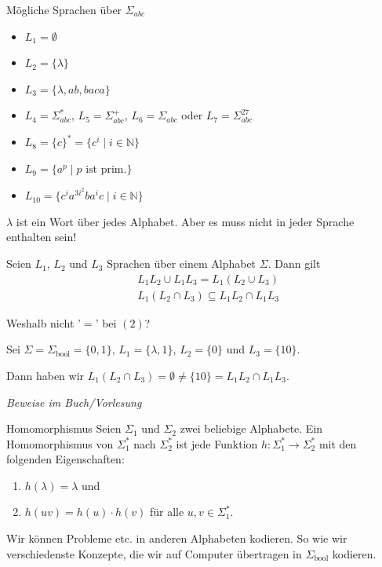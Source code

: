 \documentclass[a4paper, 11pt]{article}
\def\N{\mathbb{N}}
\begin{document}
	Mögliche Sprachen über $\Sigma_{abc}$
	\begin{itemize}[label=-]
		\item $L_1 = \emptyset$
		\item $L_2 = \{\lambda\}$
		\item $L_3 = \{\lambda, ab, baca\}$
		\item $L_4 = \Sigma_{abc}^*$, $L_5 = \Sigma_{abc}^+$, $L_6 = \Sigma_{abc}$ oder $L_7 = \Sigma_{abc}^{27}$
		\item $L_8 = \{c\}^* = \{c^i \mid i \in \N\}$
		\item $L_9 = \{a^p \mid p \text{ ist prim.}\}$
		\item $L_{10} = \{c^{i}a^{3i^2}ba^ic \mid i \in \N\}$
	\end{itemize}
	$\lambda$ ist ein Wort über jedes Alphabet. Aber es muss nicht in jeder Sprache enthalten sein!




	\begin{subbox}{}
		Seien $L_1$, $L_2$ und $L_3$ Sprachen über einem Alphabet $\Sigma$. Dann gilt
		\begin{align}
			&L_1L_2 \cup L_1L_3 = L_1(L_2 \cup L_3) \\
			&L_1(L_2 \cap L_3) \subseteq L_1L_2 \cap L_1L_3
		\end{align}
	\end{subbox}
	Weshalb nicht '$=$' bei $(2)$?

	Sei $\Sigma = \Sigma_{\text{bool}} = \{0,1\}$, $L_1 = \{\lambda, 1\}$, $L_2 = \{0\}$ und $L_3 = \{10\}$.

	Dann haben wir $L_1(L_2 \cap L_3) = \emptyset \neq \{10\} = L_1L_2 \cap L_1L_3$.

	\textit{Beweise im Buch/Vorlesung}



	\begin{mainbox}{Homomorphismus}
		Seien $\Sigma_1$ und $\Sigma_2$ zwei beliebige Alphabete. Ein Homomorphismus von $\Sigma_1^*$ nach $\Sigma_2^*$ ist jede Funktion $h: \Sigma_1^* \to \Sigma_2^*$ mit den folgenden Eigenschaften:
		\begin{enumerate}[label=(\roman*)]
			\item $h(\lambda) = \lambda$ und 
			\item $h(uv) = h(u)\cdot h(v)$ für alle $u, v \in \Sigma_1^*$.
		\end{enumerate}
	\end{mainbox}
	Wir können Probleme etc. in anderen Alphabeten kodieren. So wie wir verschiedenste Konzepte, die wir auf Computer übertragen in $\Sigma_{\text{bool}}$ kodieren.
\end{document}
